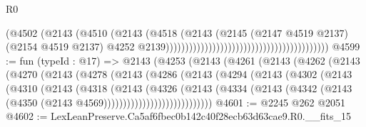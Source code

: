 \begin{lexlean}{R0}
\begin{coremodule}
                                                                          (@4502
                                                                            (@2143
                                                                              (@4510
                                                                                (@2143
                                                                                  (@4518
                                                                                    (@2143
                                                                                      (@2145
                                                                                        (@2147
                                                                                          @4519
                                                                                          @2137)
                                                                                        (@2154
                                                                                          @4519
                                                                                          @2137)
                                                                                        @4252
                                                                                        @2139))))))))))))))))))))))))))))))))))))))))))
@4599 := fun (typeId : @17) =>
  @2143
    (@4253
      (@2143
        (@4261
          (@2143
            (@4262
              (@2143
                (@4270
                  (@2143
                    (@4278
                      (@2143
                        (@4286
                          (@2143
                            (@4294
                              (@2143
                                (@4302
                                  (@2143
                                    (@4310
                                      (@2143
                                        (@4318
                                          (@2143
                                            (@4326
                                              (@2143
                                                (@4334
                                                  (@2143
                                                    (@4342
                                                      (@2143
                                                        (@4350
                                                          (@2143 @4569))))))))))))))))))))))))))))
@4601 := @2245 @262 @2051
@4602 := LexLeanPreserve.Ca5af6fbec0b142c40f28ecb63d63cae9.R0.__fits_15

\end{coremodule}
\end{lexlean}
